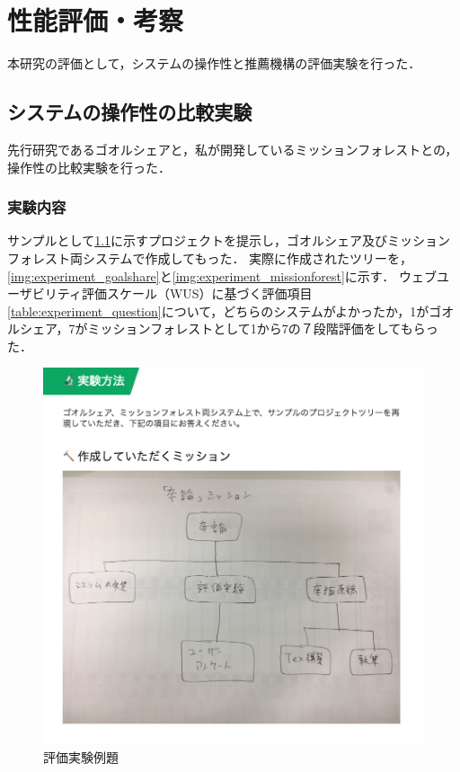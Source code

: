 \chapter{性能評価・考察}
本研究の評価として，システムの操作性と推薦機構の評価実験を行った．

\section{システムの操作性の比較実験}
先行研究であるゴオルシェアと，私が開発しているミッションフォレストとの，操作性の比較実験を行った．

\subsection{実験内容}
サンプルとして\ref{img:experiment_question}に示すプロジェクトを提示し，ゴオルシェア及びミッションフォレスト両システムで作成してもった．
実際に作成されたツリーを，\ref{img:experiment_goalshare}と\ref{img:experiment_missionforest}に示す．
ウェブユーザビリティ評価スケール（WUS）に基づく評価項目\ref{table:experiment_question}について，どちらのシステムがよかったか，1がゴオルシェア，7がミッションフォレストとして1から7の７段階評価をしてもらった．

\begin{figure}[t]
	\begin{center}
		\includegraphics[width=0.9\linewidth]{assets/img/experiment_question.png}
		\caption{評価実験例題}
		\label{img:experiment_question}
	\end{center}
\end{figure}

